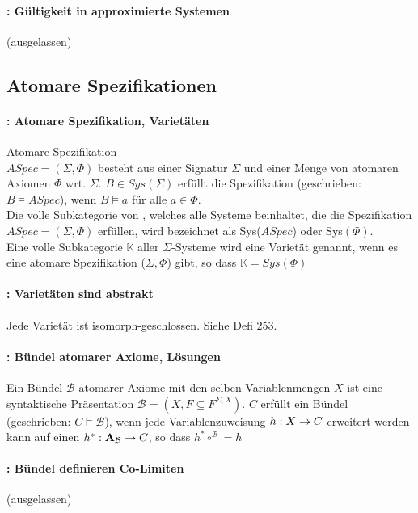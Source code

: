 \paragraph{: Gültigkeit in approximierte Systemen}
(ausgelassen)


\subsection{Atomare Spezifikationen}

\paragraph{: Atomare Spezifikation, Varietäten} 
Atomare Spezifikation \\ $ASpec = (\Sigma, \Phi)$ besteht aus einer Signatur $\Sigma$ und einer Menge von atomaren Axiomen $\Phi$ wrt. $\Sigma$.
$B \in Sys(\Sigma) $ erfüllt die Spezifikation (geschrieben: $B \models ASpec$), wenn $B \models a$ für alle $a \in \Phi$. \\
Die volle Subkategorie von \syssig, welches alle Systeme beinhaltet, die die Spezifikation $ASpec = (\Sigma, \Phi)$ erfüllen, wird bezeichnet als Sys($ASpec$) oder Sys$(\Phi)$. \\
Eine volle Subkategorie $\mathbb{K}$ aller $\Sigma$-Systeme wird eine Varietät genannt, wenn es eine atomare Spezifikation ($\Sigma, \Phi$) gibt, so dass $\mathbb{K} = Sys(\Phi)$


\paragraph{: Varietäten sind abstrakt} 
Jede Varietät ist isomorph-geschlossen. Siehe Defi 253.

\paragraph{: Bündel atomarer Axiome, Lösungen} 
Ein Bündel $\mathcal{B}$ atomarer Axiome mit den selben Variablenmengen $X$ ist eine syntaktische Präsentation $\mathcal{B} = (X, F \subseteq F^{\Sigma, X})$.
$C$ erfüllt ein Bündel (geschrieben: $C \models \mathcal{B}$), wenn jede Variablenzuweisung $h: X \rightarrow C$ erweitert werden kann auf einen \homo $h^*: \mathbf{A}_\mathcal{B} \rightarrow C$, so dass $h^* \circ^\mathcal{B} = h$


\paragraph{: Bündel definieren Co-Limiten} 
(ausgelassen)

